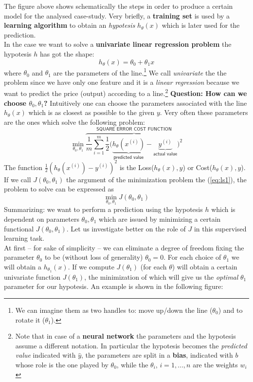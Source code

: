 The figure above shows schematically the steps in order to produce a certain model for the analysed case-study. Very briefly, a \textbf{training set} is used by a \textbf{learning algorithm} to obtain an \textit{hypotesis} $h_\theta(x)$ which is later used for the prediction.\\
In the case we want to solve a \textbf{univariate linear regression problem} the hypotesis $h$ has got the shape:
\begin{equation}
    h_{\theta}(x)=\theta_0+\theta_1{x}
\end{equation}
where $\theta_0$ and $\theta_1$ are the parameters of the line.\footnote{
    We can imagine them as two handles to: move up/down the line ($\theta_0$) and to rotate it ($\theta_1$).
} We call \textit{univariate} the the problem since we have only one feature and it is a \textit{linear regression} because we want to predict the price (output) according to a line.\footnote{
    Note that in case of a \textbf{neural network} the parameters and the hypotesis assume a different notation. In particular the hypotesis becomes the \textit{predicted value} indicated with $\hat{y}$, the parameters are split in a \textbf{bias}, indicated with $b$ whose role is the one played by $\theta_0$, while the $\theta_i$, $i=1,...,n$ are the weights $w_i$
 }
\textbf{Question: How can we choose $\theta_0, \theta_1$?} Intuitively one can choose the parameters associated with the line $h_\theta(x)$ which is as closest as possible to the given $y$. Very often these parameters are the ones which solve the following problem: 
\begin{equation}\label{eq:ls1}
    \min_{\theta_0, \theta_1} \overbrace{\frac{1}{m} \sum_{i=1}^{m}{
        \frac{1}{2} \bigl(
            \underbrace{h_\theta(x^{(i)})}_{\textsf{predicted value}}-
            \underbrace{y^{(i)}}_{\textsf{actual value}}
            \bigr)^2
    }}^{\textsf{SQUARE ERROR COST FUNCTION}}
\end{equation}
The function $\frac{1}{2} (
    h_\theta(x^{(i)})-y^{(i)})^2$ is the \textsf{Loss}($h_\theta(x), y$) or \textsf{Cost}($h_\theta(x),y$).  If we call $J(\theta_0, \theta_1)$ the argument of the minimization problem the (\ref{eq:ls1}), the problem to solve can be expressed as
\begin{equation}\label{ls2}
    \min_{\theta_0, \theta_1} {J({\theta_0, \theta_1})}
\end{equation}
Summarizing: we want to perform a prediction using the hypotesis $h$ which is dependent on parameters $\theta_0, \theta_1$ which are issued by minimizing a certain functional $J(\theta_0, \theta_1)$. Let us investigate better on the role of $J$ in this supervised learning task.\\
At first -- for sake of simplicity -- we can eliminate a degree of freedom fixing the parameter $\theta_0$ to be (without loss of generality) $\theta_0=0$. For each choice of $\theta_1$ we will obtain a $h_{\theta_1}(x)$. If we compute $J(\theta_1)$ (for each $\theta$) will obtain a certain univariate function $J(\theta_1)$, the minimization of which will give us the \textit{optimal} $\theta_1$ parameter for our hypotesis. An example is shown in the following figure:

